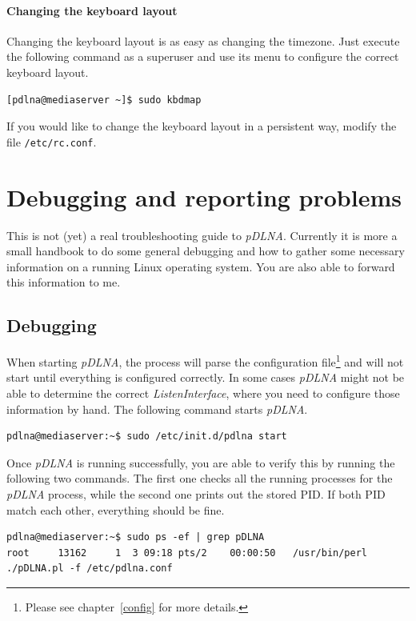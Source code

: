 \documentclass[a4paper,oneside,10pt]{report}
\begin{document}
\subsubsection{Changing the keyboard layout}

Changing the keyboard layout is as easy as changing the timezone. Just execute the following command as a superuser and use its menu to configure the correct keyboard layout.

\begin{lstlisting}
[pdlna@mediaserver ~]$ sudo kbdmap
\end{lstlisting}

If you would like to change the keyboard layout in a persistent way, modify the file \verb|/etc/rc.conf|.

%
%

\chapter{Debugging and reporting problems}
\label{troubleshooting}

This is not (yet) a real troubleshooting guide to {\em pDLNA}. Currently it is more a small handbook to do some general debugging and how to gather some necessary information on a running Linux operating system. You are also able to forward this information to me.

\section{Debugging}

When starting {\em pDLNA}, the process will parse the configuration file\footnote{Please see chapter~\ref{config} for more details.} and will not start until everything is configured correctly. In some cases {\em pDLNA} might not be able to determine the correct {\em ListenInterface}, where you need to configure those information by hand. The following command starts {\em pDLNA}.
\begin{lstlisting}
pdlna@mediaserver:~$ sudo /etc/init.d/pdlna start
\end{lstlisting}

Once {\em pDLNA} is running successfully, you are able to verify this by running the following two commands. The first one checks all the running processes for the {\em pDLNA} process, while the second one prints out the stored PID. If both PID match each other, everything should be fine.

\begin{lstlisting}
pdlna@mediaserver:~$ sudo ps -ef | grep pDLNA
root     13162     1  3 09:18 pts/2    00:00:50   /usr/bin/perl ./pDLNA.pl -f /etc/pdlna.conf
\end{lstlisting}
\end{document}
